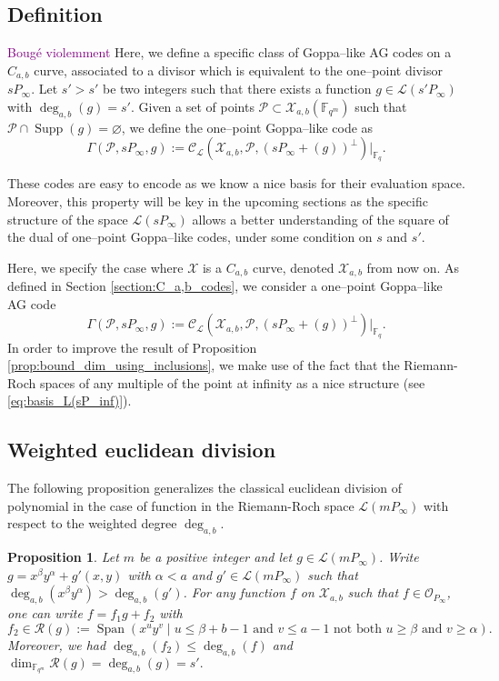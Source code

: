 \documentclass[a4paper]{article}
\newtheorem{proposition}[thm]{Proposition}
\theoremstyle{definition}
\theoremstyle{remark}
\newcommand{\calP}{\mathcal{P}}
\newcommand{\calL}{\mathcal{L}}
\newcommand{\calC}{\mathcal{C}}
\newcommand{\calO}{\mathcal{O}}
\newcommand{\calR}{\mathcal{R}}
\newcommand{\calX}{\mathcal{X}}
\newcommand{\fqm}{\mathbb{F}_{q^m}}
\newcommand{\fq}{\mathbb{F}_{q}}
\newcommand{\F}{\mathbb{F}}
\newcommand{\Span}[1]{\operatorname{Span}\left(#1\right)}
\newcommand{\Supp}{\operatorname{Supp}}
\newcommand{\degab}[1]{\deg_{a,b}\left(#1\right)}
\newcommand\jade[1]{\textcolor{purple}{#1}}
\begin{document}
\subsection{Definition}

\jade{Bougé violemment}
Here, we define a specific class of Goppa--like AG codes on a $C_{a,b}$ curve, associated to a divisor which is equivalent to the one--point divisor $sP_\infty$.
Let $s'>s'$ be two integers such that there exists a function $g \in \calL(s'P_\infty)$ with $\degab{g}=s'$. Given a set of points  $\calP \subset \calX_{a,b}(\F_{q^m})$ such that $\calP \cap \Supp(g) = \varnothing$, we define the one--point Goppa--like code as 
\[\Gamma(\calP,sP_\infty,g) := \calC_{\calL}(\calX_{a,b},\calP,(sP_\infty+(g))^{\perp})|_{\fq}.\]

These codes are easy to encode as we know a nice basis for their evaluation space. Moreover, this property will be key in the upcoming sections as the specific structure of the space $\calL(sP_\infty)$ allows a better understanding of the square of the dual of one--point Goppa--like codes, under some condition on $s$ and $s'$.



Here, we specify the case where $\calX$ is a $C_{a,b}$ curve, denoted $\calX_{a,b}$ from now on. As defined in Section \ref{section:C_a,b_codes}, we consider a one--point Goppa--like AG code
\[\Gamma(\calP,sP_\infty,g) := \calC_{\calL}(\calX_{a,b},\calP,(sP_\infty+(g))^{\perp})|_{\fq}.\]
In order to improve the result of Proposition \ref{prop:bound_dim_using_inclusions}, we make use of the fact that the Riemann-Roch spaces of any multiple of the point at infinity as a nice structure (see \ref{eq:basis_L(sP_inf)}). 



\subsection{Weighted euclidean division}

\noindent The following proposition generalizes the classical euclidean division of polynomial in the case of function in the Riemann-Roch space $\calL(mP_\infty)$ with respect to the weighted degree $\deg_{a,b}$.

\begin{proposition}\label{prop:div_grob}
Let $m$ be a positive integer and let $g \in \calL(m P_\infty)$. Write $g=x^\beta y^\alpha +g'(x,y)$ with $\alpha < a$ and $g' \in \calL(m P_\infty)$ such that $\degab{x^\beta y^\alpha}>\degab{g'}$.
For any function $f$ on $\calX_{a,b}$ such that $f \in \calO_{P_\infty}$, one can write $f=f_1g+f_2$ with 
\[f_2 \in \calR(g):= \Span{x^u y^v \mid u \leq \beta + b-1 \text{ and } v\leq a-1 \text{ not both }  u \geq \beta \text{ and } v \geq \alpha}.\]
Moreover, we had $\degab{f_2} \leq \degab{f}$ and $\dim_{\fqm} \calR(g) = \degab{g}=s'.$ 
\end{proposition}
\end{document}

